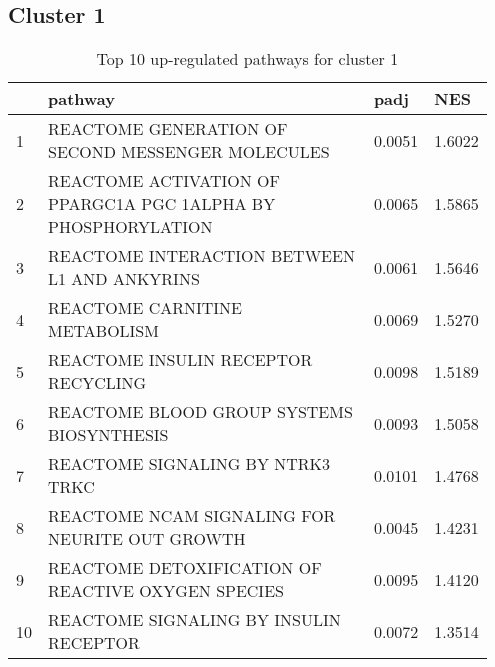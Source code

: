 \documentclass{article}
\begin{document}
\subsection{Cluster 1 }
\begin{table}[H]
\centering
\begin{tabular}{p{0.05\linewidth}p{0.7\linewidth}p{0.1\linewidth}p{0.1\linewidth}}
  \hline
 & pathway & padj & NES \\ 
  \hline
1 & REACTOME GENERATION OF SECOND MESSENGER MOLECULES & 0.0051 & 1.6022 \\ 
  2 & REACTOME ACTIVATION OF PPARGC1A PGC 1ALPHA BY PHOSPHORYLATION & 0.0065 & 1.5865 \\ 
  3 & REACTOME INTERACTION BETWEEN L1 AND ANKYRINS & 0.0061 & 1.5646 \\ 
  4 & REACTOME CARNITINE METABOLISM & 0.0069 & 1.5270 \\ 
  5 & REACTOME INSULIN RECEPTOR RECYCLING & 0.0098 & 1.5189 \\ 
  6 & REACTOME BLOOD GROUP SYSTEMS BIOSYNTHESIS & 0.0093 & 1.5058 \\ 
  7 & REACTOME SIGNALING BY NTRK3 TRKC & 0.0101 & 1.4768 \\ 
  8 & REACTOME NCAM SIGNALING FOR NEURITE OUT GROWTH & 0.0045 & 1.4231 \\ 
  9 & REACTOME DETOXIFICATION OF REACTIVE OXYGEN SPECIES & 0.0095 & 1.4120 \\ 
  10 & REACTOME SIGNALING BY INSULIN RECEPTOR & 0.0072 & 1.3514 \\ 
   \hline
\end{tabular}
\caption{Top 10 up-regulated pathways for cluster 1} 
\label{tab:q3_2_1}
\end{table}
\end{document}
